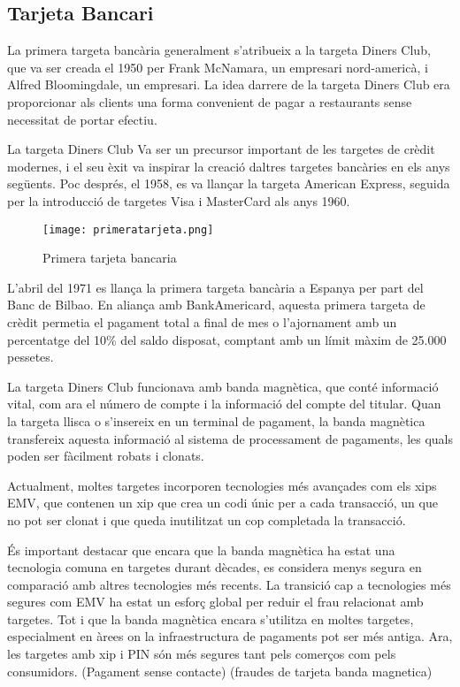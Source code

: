 


\subsection*{Tarjeta Bancari}




La primera targeta bancària generalment s'atribueix a la targeta Diners Club, que va ser creada el 1950 per Frank McNamara, un empresari nord-americà, i Alfred Bloomingdale, un empresari. La idea darrere de la targeta Diners Club era proporcionar als clients una forma convenient de pagar a restaurants sense necessitat de portar efectiu.

La targeta Diners Club Va ser un precursor important de les targetes de crèdit modernes, i el seu èxit va inspirar la creació daltres targetes bancàries en els anys següents. Poc després, el 1958, es va llançar la targeta American Express, seguida per la introducció de targetes Visa i MasterCard als anys 1960.

\begin{figure}[h]
    \centering
    \texttt{[image: primeratarjeta.png]}
    \caption{Primera tarjeta bancaria}
\end{figure}  


L'abril del 1971 es llança la primera targeta bancària a Espanya per part del Banc de Bilbao. En aliança amb BankAmericard, aquesta primera targeta de crèdit permetia el pagament total a final de mes o l'ajornament amb un percentatge del 10\% del saldo disposat, comptant amb un límit màxim de 25.000 pessetes.


La targeta Diners Club funcionava amb banda magnètica, que conté informació vital, com ara el número de compte i la informació del compte del titular. Quan la targeta llisca o s'insereix en un terminal de pagament, la banda magnètica transfereix aquesta informació al sistema de processament de pagaments, les quals poden ser fàcilment robats i clonats. 

Actualment, moltes targetes incorporen tecnologies més avançades com els xips EMV, que contenen un xip que crea un codi únic per a cada transacció, un que no pot ser clonat i que queda inutilitzat un cop completada la transacció.

És important destacar que encara que la banda magnètica ha estat una tecnologia comuna en targetes durant dècades, es considera menys segura en comparació amb altres tecnologies més recents. La transició cap a tecnologies més segures com EMV ha estat un esforç global per reduir el frau relacionat amb targetes. Tot i que la banda magnètica encara s'utilitza en moltes targetes, especialment en àrees on la infraestructura de pagaments pot ser més antiga. Ara, les targetes amb xip i PIN són més segures tant pels comerços com pels consumidors.
(Pagament sense contacte)
(fraudes de tarjeta banda magnetica)


